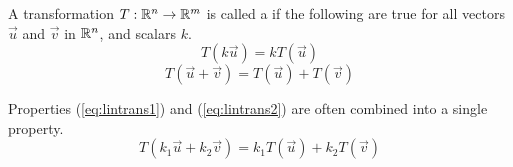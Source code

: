 \documentclass{ximera}
\begin{document}
  \begin{definition} \label{def:lin}
 A transformation $T:\mathbb{R}^n\rightarrow \mathbb{R}^m$ is called a  if the following are true for all vectors $\vec{u}$ and $\vec{v}$ in $\mathbb{R}^n$, and scalars $k$.
\begin{equation}\label{eq:lintrans1}
T(k\vec{u})= kT(\vec{u})
\end{equation}
\begin{equation}\label{eq:lintrans2}
T(\vec{u}+\vec{v})= T(\vec{u})+T(\vec{v})
\end{equation}
\end{definition}

\begin{remark}
Properties (\ref{eq:lintrans1}) and (\ref{eq:lintrans2}) are often combined into a single property.
\begin{equation}\label{eq:lintranscombinedprop}
T(k_1\vec{u}+k_2\vec{v})= k_1T(\vec{u})+k_2T(\vec{v})
\end{equation}
\end{remark}
\end{document}
